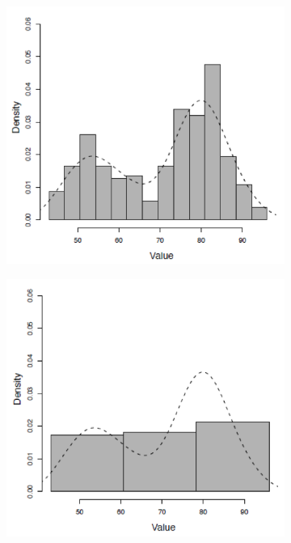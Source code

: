 \begin{figure}[H]
  \centering
  \begin{subfigure}{0.32\textwidth}
    \includegraphics[width=\textwidth]{assets/visualization_and_extraction/single_feature_example/bin_good.png}
  \end{subfigure}
  \begin{subfigure}{0.32\textwidth}
    \includegraphics[width=\textwidth]{assets/visualization_and_extraction/single_feature_example/bin_underfitting.png}

\end{subfigure}
\end{figure}
